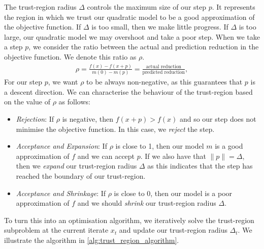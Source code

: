 The trust-region radius $\Delta$ controls the maximum size of our step $p$. It represents the region in which we trust our quadratic model to be a good approximation of the objective function. If $\Delta$ is too small, then we make little progress. If $\Delta$ is too large, our quadratic model we may overshoot and take a poor step. When we take a step $p$, we consider the ratio between the actual and prediction reduction in the objective function. We denote this ratio as $\rho$.
\begin{align}
    \rho = \frac{f(x) - f(x + p)}{m(0) - m(p)} = \frac{\text{actual reduction}}{\text{predicted reduction}},
    \label{eq:reduction_ratio}
\end{align}
For our step $p$, we want $\rho$ to be always non-negative, as this guarantees that $p$ is a descent direction. We can characterise the behaviour of the trust-region based on the value of $\rho$ as follows:
\begin{itemize}
    \item \textit{Rejection}: If $\rho$ is negative, then $f(x + p) > f(x)$ and so our step does not minimise the objective function. In this case, we \textit{reject} the step.
    \item \textit{Acceptance and Expansion}: If $\rho$ is close to 1, then our model $m$ is a good approximation of $f$ and we can accept $p$. If we also have that $\|p\| = \Delta$, then we \textit{expand} our trust-region radius $\Delta$ as this indicates that the step has reached the boundary of our trust-region.
    \item \textit{Acceptance and Shrinkage}: If $\rho$ is close to 0, then our model is a poor approximation of $f$ and we should \textit{shrink} our trust-region radius $\Delta$.
\end{itemize}

To turn this into an optimisation algorithm, we iteratively solve the trust-region subproblem at the current iterate $x_t$ and update our trust-region radius $\Delta_t$. We illustrate the algorithm in \cref{alg:trust_region_algorithm}.

